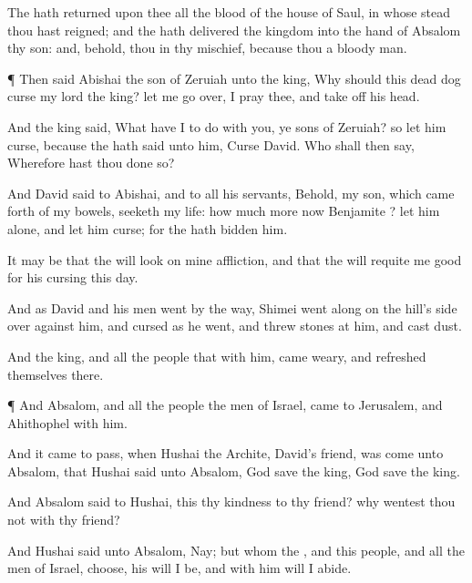 {The
{} hath
returned upon thee all the
blood of the
house of
Saul, in whose stead thou hast
reigned; and the
{} hath
delivered the
kingdom into the
hand of
Absalom thy
son: and, behold, thou
{} in thy
mischief, because thou
{} a
bloody
man.


\par }{\PP {}¶ Then
said
Abishai the
son of
Zeruiah unto the
king, Why should this
dead
dog
curse my
lord the
king? let me go
over, I pray thee, and take
off his
head.

And the
king
said, What have I to do with you, ye
sons of
Zeruiah? so let him
curse, because the
{} hath
said unto him,
Curse
David. Who shall then
say, Wherefore hast thou done
so?

And
David
said to
Abishai, and to all his
servants, Behold, my
son, which came
forth of my
bowels,
seeketh my
life: how much more now
{}
Benjamite
{}? let him
alone, and let him
curse; for the
{} hath
bidden him.

It may be that the
{} will
look on mine
affliction, and that the
{} will
requite me
good for his
cursing this
day.

And as
David and his
men
went by the
way,
Shimei went
along on the
hill’s
side over
against him, and
cursed as he
went, and
threw
stones
at him, and
cast
dust.

And the
king, and all the
people that
{} with him,
came
weary, and
refreshed themselves there.


\par }{\PP {}¶ And
Absalom, and all the
people the
men of
Israel,
came to
Jerusalem, and
Ahithophel with him.

And it came to pass, when
Hushai the
Archite,
David’s
friend, was
come unto
Absalom, that
Hushai
said unto
Absalom, God
save the
king, God
save the
king.

And
Absalom
said to
Hushai,
{} this thy
kindness to thy
friend? why
wentest thou not with thy
friend?

And
Hushai
said unto
Absalom, Nay; but whom the
{}, and this
people, and all the
men of
Israel,
choose, his will I be, and with him will I
abide.

}
